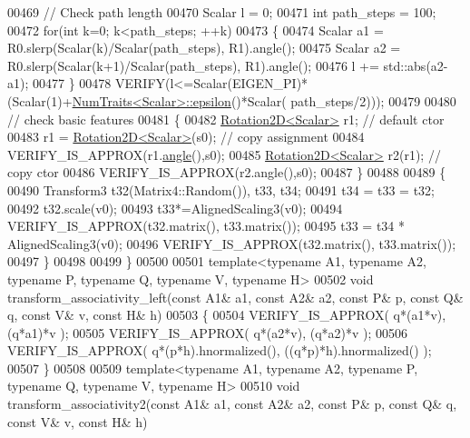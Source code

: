 \begin{DoxyCode}
00469   \textcolor{comment}{// Check path length}
00470   Scalar l = 0;
00471   \textcolor{keywordtype}{int} path\_steps = 100;
00472   \textcolor{keywordflow}{for}(\textcolor{keywordtype}{int} k=0; k<path\_steps; ++k)
00473   \{
00474     Scalar a1 = R0.slerp(Scalar(k)/Scalar(path\_steps), R1).angle();
00475     Scalar a2 = R0.slerp(Scalar(k+1)/Scalar(path\_steps), R1).angle();
00476     l += std::abs(a2-a1);
00477   \}
00478   VERIFY(l<=Scalar(EIGEN\_PI)*(Scalar(1)+\hyperlink{group___core___module_struct_eigen_1_1_num_traits}{NumTraits<Scalar>::epsilon}()*Scalar(
      path\_steps/2)));
00479   
00480   \textcolor{comment}{// check basic features}
00481   \{
00482     \hyperlink{group___geometry___module_class_eigen_1_1_rotation2_d}{Rotation2D<Scalar>} r1;           \textcolor{comment}{// default ctor}
00483     r1 = \hyperlink{group___geometry___module_class_eigen_1_1_rotation2_d}{Rotation2D<Scalar>}(s0);     \textcolor{comment}{// copy assignment}
00484     VERIFY\_IS\_APPROX(r1.\hyperlink{group___geometry___module_af34ab8da6bfe010ca66c8acafa239a6e}{angle}(),s0);
00485     \hyperlink{group___geometry___module_class_eigen_1_1_rotation2_d}{Rotation2D<Scalar>} r2(r1);       \textcolor{comment}{// copy ctor}
00486     VERIFY\_IS\_APPROX(r2.angle(),s0);
00487   \}
00488 
00489   \{
00490     Transform3 t32(Matrix4::Random()), t33, t34;
00491     t34 = t33 = t32;
00492     t32.scale(v0);
00493     t33*=AlignedScaling3(v0);
00494     VERIFY\_IS\_APPROX(t32.matrix(), t33.matrix());
00495     t33 = t34 * AlignedScaling3(v0);
00496     VERIFY\_IS\_APPROX(t32.matrix(), t33.matrix());
00497   \}
00498 
00499 \}
00500 
00501 \textcolor{keyword}{template}<\textcolor{keyword}{typename} A1, \textcolor{keyword}{typename} A2, \textcolor{keyword}{typename} P, \textcolor{keyword}{typename} Q, \textcolor{keyword}{typename} V, \textcolor{keyword}{typename} H>
00502 \textcolor{keywordtype}{void} transform\_associativity\_left(\textcolor{keyword}{const} A1& a1, \textcolor{keyword}{const} A2& a2, \textcolor{keyword}{const} P& p, \textcolor{keyword}{const} Q& q, \textcolor{keyword}{const} V& v, \textcolor{keyword}{const} H& 
      h)
00503 \{
00504   VERIFY\_IS\_APPROX( q*(a1*v), (q*a1)*v );
00505   VERIFY\_IS\_APPROX( q*(a2*v), (q*a2)*v );
00506   VERIFY\_IS\_APPROX( q*(p*h).hnormalized(),  ((q*p)*h).hnormalized() );
00507 \}
00508 
00509 \textcolor{keyword}{template}<\textcolor{keyword}{typename} A1, \textcolor{keyword}{typename} A2, \textcolor{keyword}{typename} P, \textcolor{keyword}{typename} Q, \textcolor{keyword}{typename} V, \textcolor{keyword}{typename} H>
00510 \textcolor{keywordtype}{void} transform\_associativity2(\textcolor{keyword}{const} A1& a1, \textcolor{keyword}{const} A2& a2, \textcolor{keyword}{const} P& p, \textcolor{keyword}{const} Q& q, \textcolor{keyword}{const} V& v, \textcolor{keyword}{const} H& h)

\end{DoxyCode}
